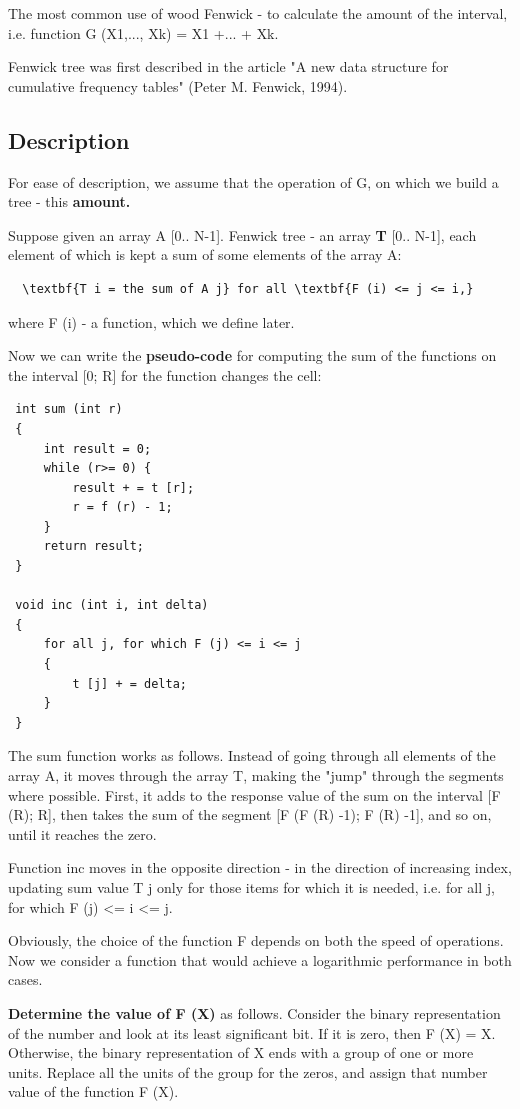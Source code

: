 The most common use of wood Fenwick - to calculate the amount of the interval, i.e. function G (X1,..., Xk) = X1 +... + Xk.

Fenwick tree was first described in the article "A new data structure for cumulative frequency tables" (Peter M. Fenwick, 1994).

\subsection{ Description }
For ease of description, we assume that the operation of G, on which we build a tree - this \textbf{amount.}

Suppose given an array A [0.. N-1]. Fenwick tree - an array \textbf{T} [0.. N-1], each element of which is kept a sum of some elements of the array A:

\begin{verbatim}
  \textbf{T i = the sum of A j} for all \textbf{F (i) <= j <= i,} 
\end{verbatim}
where F (i) - a function, which we define later.

Now we can write the \textbf{pseudo-code} for computing the sum of the functions on the interval [0; R] for the function changes the cell:

\begin{verbatim}
 int sum (int r)
 {
     int result = 0;
     while (r>= 0) {
         result + = t [r];
         r = f (r) - 1;
     }
     return result;
 }

 void inc (int i, int delta)
 {
     for all j, for which F (j) <= i <= j
     {
         t [j] + = delta;
     }
 } 
\end{verbatim}
The sum function works as follows. Instead of going through all elements of the array A, it moves through the array T, making the "jump" through the segments where possible. First, it adds to the response value of the sum on the interval [F (R); R], then takes the sum of the segment [F (F (R) -1); F (R) -1], and so on, until it reaches the zero.

Function inc moves in the opposite direction - in the direction of increasing index, updating sum value T j only for those items for which it is needed, i.e. for all j, for which F (j) <= i <= j.

Obviously, the choice of the function F depends on both the speed of operations. Now we consider a function that would achieve a logarithmic performance in both cases.

\textbf{Determine the value of F (X)} as follows. Consider the binary representation of the number and look at its least significant bit. If it is zero, then F (X) = X. Otherwise, the binary representation of X ends with a group of one or more units. Replace all the units of the group for the zeros, and assign that number value of the function F (X).

